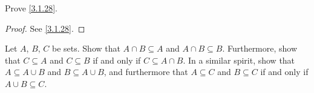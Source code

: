 \begin{exercise}\label{ex 3.1.6}
  Prove \cref{3.1.28}.
\end{exercise}

\begin{proof}
  See \cref{3.1.28}.
\end{proof}

\begin{exercise}\label{ex 3.1.7}
  Let \(A\), \(B\), \(C\) be sets.
  Show that \(A \cap B \subseteq A\) and \(A \cap B \subseteq B\).
  Furthermore, show that \(C \subseteq A\) and \(C \subseteq B\) if and only if \(C \subseteq A \cap B\).
  In a similar spirit, show that \(A \subseteq A \cup B\) and \(B \subseteq A \cup B\), and furthermore that \(A \subseteq C\) and \(B \subseteq C\) if and only if \(A \cup B \subseteq C\).
\end{exercise}

